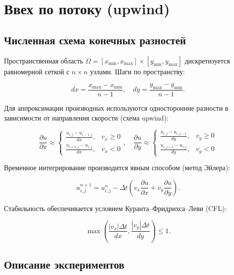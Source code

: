 \section{Ввех по потоку (upwind)}
\subsection{Численная схема конечных разностей}

Пространственная область \(\Omega = [x_{\min}, x_{\max}] \times [y_{\min}, y_{\max}]\) дискретизуется равномерной сеткой с \(n \times n\) узлами. Шаги по пространству:

\[
dx = \frac{x_{\max} - x_{\min}}{n - 1}, \quad dy = \frac{y_{\max} - y_{\min}}{n - 1}.
\]

Для аппроксимации производных используются односторонние разности в зависимости от направления скорости (схема upwind):

\[
\frac{\partial u}{\partial x} \approx
\begin{cases}
	\frac{u_{i,j} - u_{i-1,j}}{dx}, & v_x \geq 0 \\
	\frac{u_{i+1,j} - u_{i,j}}{dx}, & v_x < 0
\end{cases}, \quad
\frac{\partial u}{\partial y} \approx
\begin{cases}
	\frac{u_{i,j} - u_{i,j-1}}{dy}, & v_y \geq 0 \\
	\frac{u_{i,j+1} - u_{i,j}}{dy}, & v_y < 0
\end{cases}
\]

Временное интегрирование производится явным способом (метод Эйлера):

\[
u_{i,j}^{n+1} = u_{i,j}^{n} - \Delta t \left( v_x \frac{\partial u}{\partial x} + v_y \frac{\partial u}{\partial y} \right).
\]

Стабильность обеспечивается условием Куранта–Фридрихса–Леви (CFL):

\begin{equation}
	\max \left( \frac{|v_x| \Delta t}{dx}, \frac{|v_y| \Delta t}{dy} \right) \leq 1.
	\label{eq:cfl_condition}
\end{equation}

\subsection{Описание экспериментов}

